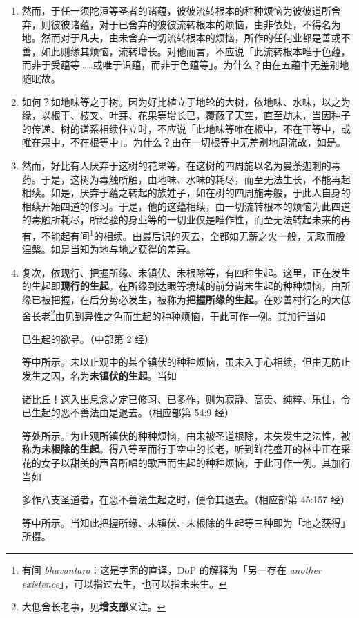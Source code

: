\begin{enumerate}
\item 然而，于任一须陀洹等圣者的诸蕴，彼彼流转根本的种种烦恼为彼彼道所舍弃，则彼彼诸蕴，对于已舍弃的彼彼流转根本的烦恼，由非依处，不得名为地。然而对于凡夫，由未舍弃一切流转根本的烦恼，所作的任何业都是善或不善，如此则缘其烦恼，流转增长。对他而言，不应说「此流转根本唯于色蕴，而非于受蕴等……或唯于识蕴，而非于色蕴等」。为什么？由在五蕴中无差别地随眠故。
\item 如何？如地味等之于树。因为好比植立于地轮的大树，依地味、水味，以之为缘，以根干、枝叉、叶芽、花果等增长已，覆蔽了天空，直至劫末，当因种子的传递、树的谱系相续住立时，不应说「此地味等唯在根中，不在干等中，或唯在果中，不在根等中」。为什么？由在一切根等中无差别地周流故，如是。
\item 然而，好比有人厌弃于这树的花果等，在这树的四周施以名为曼荼迦刺的毒药。于是，这树为毒触所触，由地味、水味的耗尽，而至无法生长，不能再起相续。如是，厌弃于蕴之转起的族姓子，如在树的四周施毒般，于此人自身的相续开始四道的修习。于是，他的这蕴相续，由一切流转根本的烦恼为此四道的毒触所耗尽，所经验的身业等的一切业仅是唯作性，而至无法转起未来的再有，不能起有间\footnote{有间 \textit{bhavantara}：这是字面的直译，DoP 的解释为「另一存在 \textit{another existence}」，可以指过去生，也可以指未来生。}的相续。由最后识的灭去，全都如无薪之火一般，无取而般涅槃。如是当知为地与地之获得的差异。
\item 复次，依现行、把握所缘、未镇伏、未根除等，有四种生起。这里，正在发生的生起即\textbf{现行的生起}。在所缘到达眼等境域的前分尚未生起的种种烦恼，由所缘已被把握，在后分势必发生，被称为\textbf{把握所缘的生起}。在妙善村行乞的大低舍长老\footnote{大低舍长老事，见\textbf{增支部}义注。}由见到异性之色而生起的种种烦恼，于此可作一例。其加行当如\begin{quoting}已生起的欲寻。（中部第 2 经）\end{quoting}等中所示。未以止观中的某个镇伏的种种烦恼，虽未入于心相续，但由无防止发生之因，名为\textbf{未镇伏的生起}。当如\begin{quoting}诸比丘！这入出息念之定已修习、已多作，则为寂静、高贵、纯粹、乐住，令已生起的恶不善法由是退去。（相应部第 54:9 经）\end{quoting}等处所示。为止观所镇伏的种种烦恼，由未被圣道根除，未失发生之法性，被称为\textbf{未根除的生起}。得八等至而行于空中的长老，听到鲜花盛开的林中正在采花的女子以甜美的声音所唱的歌声而生起的种种烦恼，于此可作一例。其加行当如\begin{quoting}多作八支圣道者，在恶不善法生起之时，便令其退去。（相应部第 45:157 经）\end{quoting}等中所示。当知此把握所缘、未镇伏、未根除的生起等三种即为「地之获得」所摄。

\end{enumerate}
